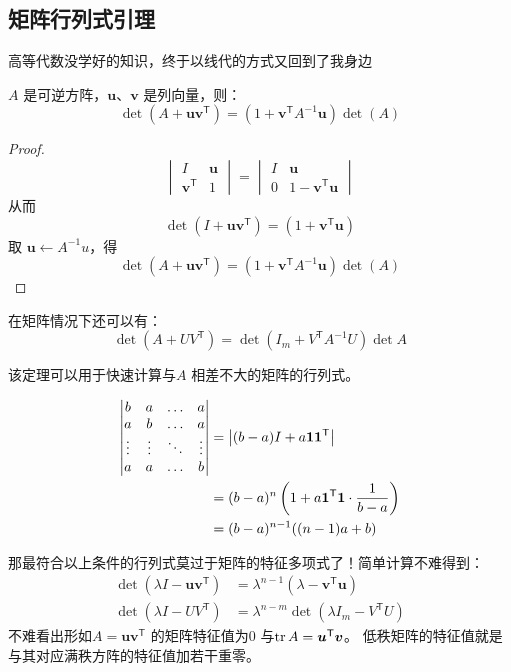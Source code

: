 \subsection{矩阵行列式引理}
高等代数没学好的知识，终于以线代的方式又回到了我身边

\begin{theorem}[矩阵行列式引理]
    \(A\) 是可逆方阵，\(\bm{u}\)、\(\bm{v}\) 是列向量，则：
    \[
        \det(A +\bm {uv}^{\mathsf{T}})=(1+\bm {v}^{\mathsf{T}}A^{-1}\bm {u} ) \det(A)
    \]
    \label{theorem:matrix-determinent-lemma}
\end{theorem}

\begin{proof}
    \[
        \begin{vmatrix}
            I & \bm{u} \\
            \bm{v}^{\mathsf{T}} & 1
        \end{vmatrix} =
        \begin{vmatrix}
            I & \bm{u}\\
            0 & 1-\bm{v}^{\mathsf{T}}\bm{u}
        \end{vmatrix}
    \]
    从而\[
        \det(I +\bm {uv}^{\mathsf{T}})=(1+\bm {v}^{\mathsf{T}}\bm {u})
    \]
    取 \(\bm{u} \leftarrow A^{-1}u\)，得\[
        \det(A +\bm {uv}^{\mathsf{T}})=(1+\bm {v}^{\mathsf{T}}A^{-1}\bm {u} ) \det(A)
    \]
\end{proof}
在矩阵情况下还可以有：
\[
    \det(A+ UV^{\mathsf{T}}) = \det(I_{m} + V^{\mathsf{T}}A^{-1}U) \det A
\]

该定理可以用于快速计算与\(A\) 相差不大的矩阵的行列式。
\begin{example}[差一点单位阵行列式]
    \begin{align*}
        \begin{vmatrix}
            b & a & \dots & a \\
            a & b & \dots & a \\
            \vdots &\vdots & \ddots & \vdots \\
            a & a & \dots & b
        \end{vmatrix} &= \left|(b-a)I+a \bm{1}\bm{1}^{\mathsf{T}}\right| \\
        &= (b-a)^{n} \left( 1+a \bm{1}^{\mathsf{T}}\bm{1} \cdot \frac{1}{b-a} \right) \\
        &= (b-a)^{n-1} ((n-1)a+b)
    \end{align*}
\end{example}
那最符合以上条件的行列式莫过于矩阵的特征多项式了！简单计算不难得到：
\begin{align*}
    \det(\lambda I - \bm{u}\bm{v}^{\mathsf{T}}) &= \lambda^{n-1} (\lambda - \bm{v}^{\mathsf{T}}\bm{u})\\
    \det(\lambda I - UV^{\mathsf{T}}) &= \lambda^{n-m} \det(\lambda I_{m}-V^{\mathsf{T}}U)
\end{align*}
不难看出形如\(A=\bm{u}\bm{v}^{\mathsf{T}}\) 的矩阵特征值为\(0\) 与\(\operatorname{tr} A = \bm{u}^{\mathsf{T}}\bm{v}\)。
低秩矩阵的特征值就是与其对应满秩方阵的特征值加若干重零。
